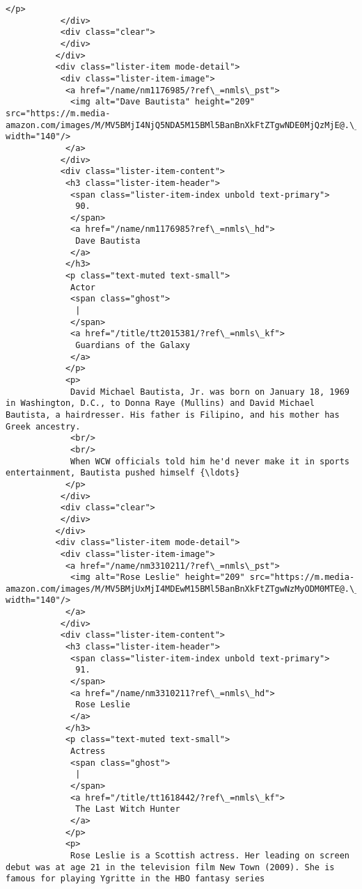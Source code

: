 \documentclass[11pt]{article}
\begin{document}
\begin{Verbatim}[commandchars=\\\{\}]
            </p>
           </div>
           <div class="clear">
           </div>
          </div>
          <div class="lister-item mode-detail">
           <div class="lister-item-image">
            <a href="/name/nm1176985/?ref\_=nmls\_pst">
             <img alt="Dave Bautista" height="209" src="https://m.media-amazon.com/images/M/MV5BMjI4NjQ5NDA5M15BMl5BanBnXkFtZTgwNDE0MjQzMjE@.\_V1\_UY209\_CR94,0,140,209\_AL\_.jpg" width="140"/>
            </a>
           </div>
           <div class="lister-item-content">
            <h3 class="lister-item-header">
             <span class="lister-item-index unbold text-primary">
              90.
             </span>
             <a href="/name/nm1176985?ref\_=nmls\_hd">
              Dave Bautista
             </a>
            </h3>
            <p class="text-muted text-small">
             Actor
             <span class="ghost">
              |
             </span>
             <a href="/title/tt2015381/?ref\_=nmls\_kf">
              Guardians of the Galaxy
             </a>
            </p>
            <p>
             David Michael Bautista, Jr. was born on January 18, 1969 in Washington, D.C., to Donna Raye (Mullins) and David Michael Bautista, a hairdresser. His father is Filipino, and his mother has Greek ancestry.
             <br/>
             <br/>
             When WCW officials told him he'd never make it in sports entertainment, Bautista pushed himself {\ldots}
            </p>
           </div>
           <div class="clear">
           </div>
          </div>
          <div class="lister-item mode-detail">
           <div class="lister-item-image">
            <a href="/name/nm3310211/?ref\_=nmls\_pst">
             <img alt="Rose Leslie" height="209" src="https://m.media-amazon.com/images/M/MV5BMjUxMjI4MDEwM15BMl5BanBnXkFtZTgwNzMyODM0MTE@.\_V1\_UX140\_CR0,0,140,209\_AL\_.jpg" width="140"/>
            </a>
           </div>
           <div class="lister-item-content">
            <h3 class="lister-item-header">
             <span class="lister-item-index unbold text-primary">
              91.
             </span>
             <a href="/name/nm3310211?ref\_=nmls\_hd">
              Rose Leslie
             </a>
            </h3>
            <p class="text-muted text-small">
             Actress
             <span class="ghost">
              |
             </span>
             <a href="/title/tt1618442/?ref\_=nmls\_kf">
              The Last Witch Hunter
             </a>
            </p>
            <p>
             Rose Leslie is a Scottish actress. Her leading on screen debut was at age 21 in the television film New Town (2009). She is famous for playing Ygritte in the HBO fantasy series

\end{Verbatim}
\end{document}
